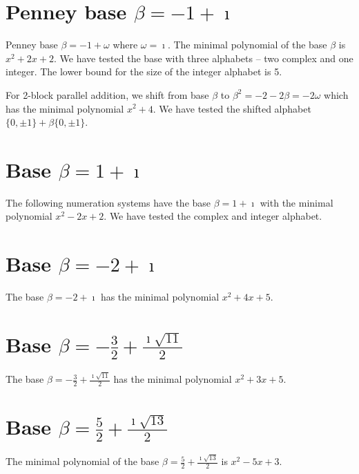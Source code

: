 \section{\texorpdfstring{Penney base $\beta = -1 + \imath$}{Penney base beta = -1 + i}}
Penney base $\beta = -1 + \omega$ where $\omega=\imath$. The minimal polynomial of the base $\beta$ is $x^2 + 2x+2$. We have tested the base with three alphabets -- two complex and one integer. The lower bound for the size of the integer alphabet is 5.




For 2-block parallel addition, we shift from base $\beta$ to $\beta^2=-2-2\beta=-2\omega$ which has the minimal polynomial $x^{2} + 4$. We have tested the shifted alphabet $\{0,\pm 1\}+\beta \{0,\pm 1\}$.



\section{\texorpdfstring{Base $\beta = 1 + \imath$}{Base beta = 1 + i}}
The following numeration systems have the base $\beta =1 + \imath$ with the minimal polynomial $x^2-2x+2$. We have tested the complex and integer alphabet. 



 

\section{\texorpdfstring{Base $\beta = -2 + \imath$}{Base beta = -2 + i}}
The base  $\beta = -2 + \imath$ has the minimal polynomial $x^2+4x +5$.

% 
\section{\texorpdfstring{Base $\beta = -\frac{3}{2} + \frac{\imath \sqrt{11}}{2}$}{Base beta = -{3}/{2} + i sqrt(11)/{2}}}
The base $\beta = -\frac{3}{2} + \frac{\imath \sqrt{11}}{2}$ has the minimal polynomial  $x^2+3x +5$.


\section{\texorpdfstring{Base $\beta = \frac{5}{2} + \frac{\imath \sqrt{13}}{2}$}{Base beta = {5}/{2} + i sqrt(13)/2}}
The minimal polynomial of the base $\beta = \frac{5}{2} + \frac{\imath \sqrt{13}}{2}$ is $x^2 -5x+3$.


